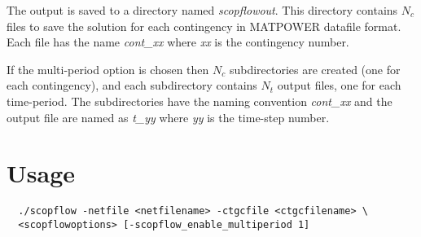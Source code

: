 The \scopflow output is saved to a directory named \emph{scopflowout}. This directory contains $N_c$ files to save the solution for each contingency in MATPOWER datafile format. Each file has the name \emph{cont\_xx} where \emph{xx} is the contingency number. 

If the multi-period option is chosen then $N_c$ subdirectories are created (one for each contingency), and each subdirectory contains $N_t$ output files, one for each time-period. The subdirectories have the naming convention \emph{cont\_xx} and the output file are named as \emph{t\_yy} where \emph{yy} is the time-step number.

\section{Usage}

\begin{lstlisting}
  ./scopflow -netfile <netfilename> -ctgcfile <ctgcfilename> \
  <scopflowoptions> [-scopflow_enable_multiperiod 1]
\end{lstlisting}

